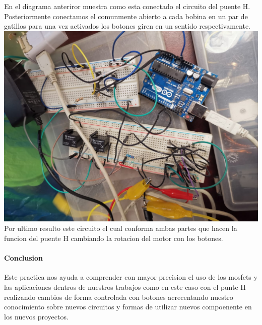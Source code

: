 \documentclass[12pt,a4paper]{report}
\begin{document}
En el diagrama anteriror muestra como esta conectado el circuito del puente H.
\\
Posteriormente conectamos el comunmente abierto a cada bobina en un par de gatillos para una vez activados los botones giren en un sentido respectivamente.
\\
\includegraphics[scale=.2]{final.jpg}         
\\
Por ultimo resulto este circuito el cual conforma ambas partes que hacen la funcion del puente H cambiando la rotacion del motor con los botones.
\\
\paragraph{Conclusion}
Este practica nos ayuda a comprender con mayor precision el uso de los mosfets y las aplicaciones dentros de nuestros trabajos como en este caso con el punte H realizando cambios de forma controlada con botones acrecentando nuestro conocimiento sobre nuevos circuitos y formas de utilizar nuevos compoenente en los nuevos proyectos.
\end{document}
